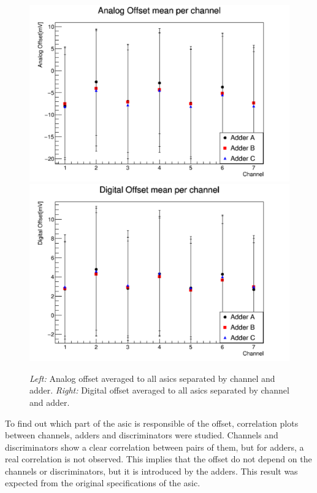 \documentclass[main.tex]{subfiles}
\begin{document}
\begin{figure}
  \centering
  \includegraphics[width=\textwidth]{./Pictures/analogch.pdf}
  \endminipage
  \includegraphics[width=\textwidth]{./Pictures/digitalch.pdf}
  \endminipage
  \caption{\textit{Left:} Analog offset averaged to all \glspl{asic} separated by channel and adder. \textit{Right:} Digital offset averaged to all \glspl{asic} separated by channel and adder.}
  \label{fig:offch}
\end{figure}

To find out which part of the \gls{asic} is responsible of the offset, correlation plots between channels, adders and discriminators were studied. Channels and discriminators show a clear correlation between pairs of them, but for adders, a real correlation is not observed. This implies that the offset do not depend on the channels or discriminators, but it is introduced by the adders. This result was expected from the original specifications of the \gls{asic}.
\end{document}
